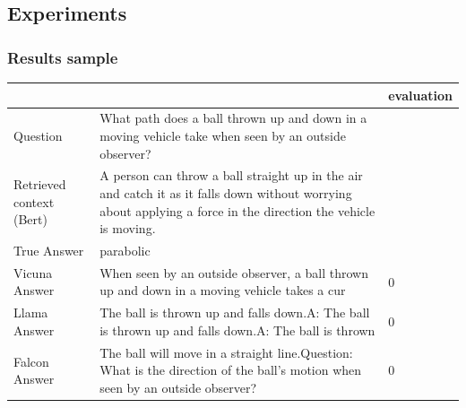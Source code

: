 \documentclass[a4paper,12pt]{article}
\begin{document}
\subsection{Experiments}
\label{ann:experiments}
\subsubsection*{Results sample}
\begin{table}[htbp]
    \centering
    \begin{tabular}{|p{3cm} p{7cm} p{2cm}|}
    \hline
        &  & evaluation \\
    \hline
    Question & What path does a ball thrown up and down in a moving vehicle take when seen by an outside observer? & \\
    \hline
    Retrieved context (Bert) & A person can throw a ball straight up in the air and catch it as it falls down without worrying about applying a force in the direction the vehicle is moving. &  \\
    \hline
    True Answer & parabolic & \\
    \hline
    Vicuna Answer & When seen by an outside observer, a ball thrown up and down in a moving vehicle takes a cur & 0 \\
    \hline
    Llama Answer & The ball is thrown up and falls down.\newline \newline A: The ball is thrown up and falls down.\newline \newline A: The ball is thrown & 0\\
    \hline
    Falcon Answer & The ball will move in a straight line.\newline Question: What is the direction of the ball's motion when seen by an outside observer? & 0\\
    \hline
    \end{tabular}
\end{table}
\end{document}
